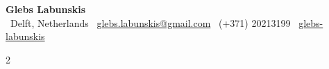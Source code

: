 \documentclass[a4paper,10pt]{article}
\begin{document}
\begin{center}
{\Huge \textbf{Glebs Labunskis}}\\[4pt] 
\faMapMarker*~Delft, Netherlands \quad
\faEnvelope~\href{mailto:glebs.labunskis@gmail.com}{glebs.labunskis@gmail.com} \quad
\faPhone~(+371) 20213199 \quad
\faLinkedin~\href{https://www.linkedin.com/in/glebs-labunskis/}{glebs-labunskis}
\end{center}

\vspace{0.3cm}
\begin{paracol}{2}
\setlength{\columnsep}{1cm}






\switchcolumn





\end{paracol}
\end{document}
